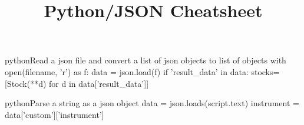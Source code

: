 \documentclass[10pt,a4paper]{article}
\title{\color{w3schools}Python/JSON Cheatsheet
}
\begin{document}
\maketitle

\small
\begin{multicols}{3}

\thispagestyle{empty}
\scriptsize



\begin{codebox}{python}{Read a json file and convert a list of json objects to list of objects}
with open(filename, 'r') as f:
        data = json.load(f)
        if 'result_data' in data:
            stocks=[Stock(**d) for d in data['result_data']]

\end{codebox}

\begin{codebox}{python}{Parse a string as a json object}
data = json.loads(script.text)
instrument = data['custom']['instrument']

\end{codebox}


\AtNextBibliography{\footnotesize}
\printbibliography  
\end{multicols}
\end{document}
